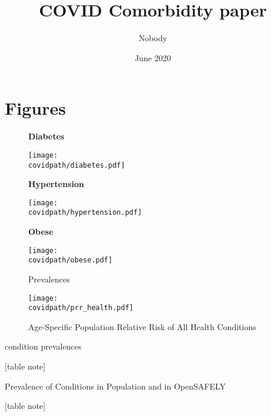 \documentclass[12pt,letterpaper]{article}
\title{COVID Comorbidity paper} \author{Nobody}
\numberwithin{equation}{section}
\begin{document}
\date{June 2020}

  \section{Figures}

  \begin{figure}[H]
    \begin{center}
      \caption{Prevalences}
      
      \textbf{Diabetes}
      
      \texttt{[image: \\covidpath/diabetes.pdf]}

      \textbf{Hypertension}
      
      \texttt{[image: \\covidpath/hypertension.pdf]}

      \textbf{Obese}
      
      \texttt{[image: \\covidpath/obese.pdf]}
    
    \end{center}
  \end{figure}
  
  \begin{figure}[H]
    \begin{center}
      \caption{Age-Specific Population Relative Risk of All Health Conditions}
      
      \texttt{[image: \\covidpath/prr\_health.pdf]}
    
    \end{center}
  \end{figure}
  
   \begin{table}[H]
    \begin{center}
     \caption{condition prevalences }
     
     
     \footnotesize{[table note]}
    \end{center}
   \end{table}
 
  \begin{table}[H]
    \begin{center}
    \caption{Prevalence of Conditions in Population and in OpenSAFELY}
    
    
    \footnotesize{[table note]}
    \end{center}
  \end{table}
\end{document}
